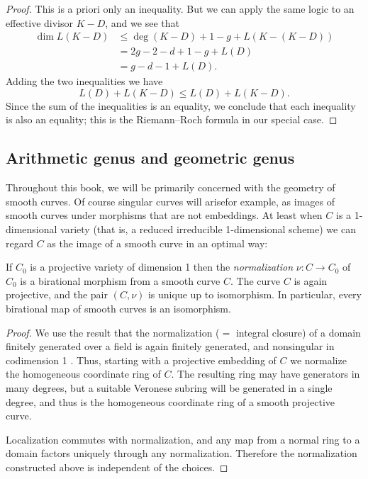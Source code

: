 \begin{proof}
This is a priori only an inequality. But we can apply the same logic to an effective divisor $K-D$, and we see that
\begin{align*}
\dim L(K-D) &\leq \deg(K-D) + 1 - g + L(K - (K-D)) \\
& = 2g - 2 - d + 1 - g  + L(D) \\
&= g - d - 1 + L(D).
\end{align*}
Adding the two inequalities we have
$$
L(D) + L(K-D) \leq L(D) + L(K-D).
$$
Since the sum of the inequalities is an equality, we conclude that each inequality is also an equality; this is the Riemann--Roch formula
in our special case.
\end{proof}

\subsection*{Arithmetic genus and geometric genus}

Throughout this book, we will be primarily concerned with the geometry of smooth curves. Of course singular curves will arise\emdash for example, as images of smooth curves under morphisms that are not embeddings. At least when $C$ is a 1-dimensional variety (that is, a 
reduced irreducible 1-dimensional scheme) we can  regard $C$ as the image of a smooth curve in an optimal way:

\begin{proposition}\label{resolution of singularities}
If $C_0$ is a projective variety of dimension 1 then the \emph{normalization} $\nu: C \to C_0$ of $C_0$ is a birational
morphism from a smooth curve $C$. The curve $C$ is again projective, and the pair $(C, \nu)$ is
unique up to  isomorphism. In particular, every birational map of smooth curves is an isomorphism.
\end{proposition}
 
\begin{proof}
  We use the result that the normalization ($=$ integral closure) of a domain
finitely generated over a field is again finitely generated, and nonsingular in codimension 1 \cite[Theorem 4.14 and 11.5]{Eisenbud1995}. Thus,
starting with a projective embedding of $C$ we normalize the homogeneous coordinate ring of $C$. The resulting ring
may have generators in many degrees, but a suitable Veronese subring will be generated in a single degree, and thus
is the homogeneous coordinate ring of a smooth projective curve. 

Localization
commutes with normalization, and any map from a normal ring to a
domain factors uniquely through any normalization. 
Therefore
the normalization constructed above is independent of the choices.
\end{proof}

